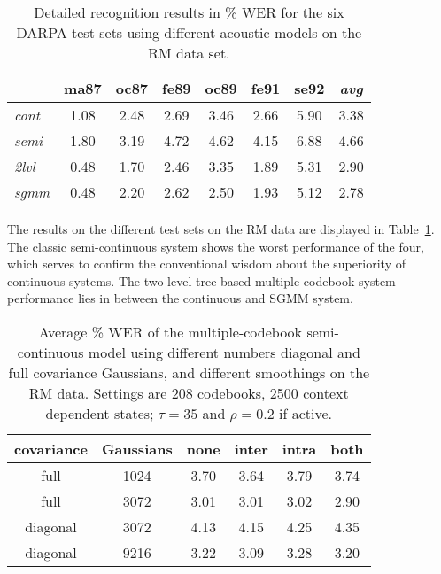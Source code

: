 \documentclass{article}
\begin{document}
\begin{table}%
\begin{center}
\begin{tabular}{|l||c|c|c|c|c|c||c|}
\hline
~               & ma87 & oc87 & fe89 & oc89 & fe91 & se92 & {\em avg}  \\ \hline\hline
{\em cont} &  1.08 &  2.48 &  2.69 &  3.46 &  2.66 &  5.90 & 3.38 \\ \hline
{\em semi} &  1.80 &  3.19 &  4.72 &  4.62 &  4.15 &  6.88 & 4.66 \\ \hline 
{\em 2lvl} &  0.48 &  1.70 &  2.46 &  3.35 &  1.89 &  5.31 & 2.90 \\ \hline
{\em sgmm} &  0.48 &  2.20 &  2.62 &  2.50 &  1.93 &  5.12 & 2.78 \\ \hline
\end{tabular}
\end{center}
\caption{\label{tab:res_rm}
Detailed recognition results in \% WER for the six DARPA test sets using 
different acoustic models on the RM data set.
}
\end{table}

The results on the different test sets on the RM data are displayed in 
Table~\ref{tab:res_rm}. The classic semi-continuous system shows the worst 
performance of the four, which serves to confirm the conventional wisdom
about the superiority of continuous systems.
The two-level tree based multiple-codebook system performance lies in between the 
continuous and SGMM system.



\begin{table}%
\begin{center}
\begin{tabular}{|c|c||c|c|c|c|}
\hline
covariance & Gaussians & none & inter & intra & both \\ \hline\hline
full       &      1024 & 3.70 & 3.64 & 3.79 & 3.74 \\ \hline
full       &      3072 & 3.01 & 3.01 & 3.02 & 2.90 \\ \hline\hline
diagonal   &      3072 & 4.13 & 4.15 & 4.25 & 4.35 \\ \hline
diagonal   &      9216 & 3.22 & 3.09 & 3.28 & 3.20 \\ \hline
\end{tabular}
\end{center}
\caption{\label{tab:rm_diagfull}
Average \% WER of the multiple-codebook semi-continuous model using different 
numbers diagonal and full covariance Gaussians, and different smoothings 
on the RM data. 
Settings are 208 codebooks, 2500 context dependent states; $\tau = 35$ 
and $\rho = 0.2$ if active.
}
\end{table}
\end{document}
